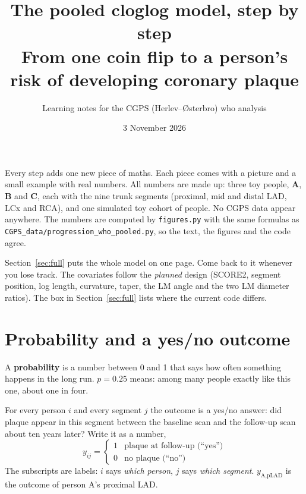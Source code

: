 \documentclass[11pt,a4paper]{article}
\title{The pooled cloglog model, step by step\\[4pt]
\large From one coin flip to a person's risk of developing coronary plaque}
\author{Learning notes for the CGPS (Herlev--Østerbro) who analysis}
\date{3 November 2026}
\begin{document}
\maketitle

\begin{tcolorbox}[colback=black!3,colframe=black!40,title=How to read this]
Every step adds one new piece of maths. Each piece comes with a picture and a small example with real numbers.
All numbers are made up: three toy people, \textbf{A}, \textbf{B} and \textbf{C}, each with the nine trunk segments
(proximal, mid and distal LAD, LCx and RCA), and one simulated toy cohort of \ntoyN{} people.
No CGPS data appear anywhere. The numbers are computed by \texttt{figures.py} with the same formulas as
\texttt{CGPS\_data/progression\_who\_pooled.py}, so the text, the figures and the code agree.

Section~\ref{sec:full} puts the whole model on one page. Come back to it whenever you lose track.
The covariates follow the \emph{planned} design (SCORE2, segment position, log length, curvature, taper, the LM angle and
the two LM diameter ratios). The box in Section~\ref{sec:full} lists where the current code differs.
\end{tcolorbox}

\tableofcontents
\newpage

\section{Probability and a yes/no outcome}
\label{sec:prob}

\begin{idea}
A \textbf{probability} is a number between 0 and 1 that says how often something happens in the long run.
$p = 0.25$ means: among many people exactly like this one, about one in four.
\end{idea}

For every person $i$ and every segment $j$ the outcome is a yes/no answer: did plaque appear in this segment between the
baseline scan and the follow-up scan about ten years later? Write it as a number,
\[
y_{ij} = \begin{cases} 1 & \text{plaque at follow-up (``yes'')} \\ 0 & \text{no plaque (``no'')} \end{cases}
\]
The subscripts are labels: $i$ says \emph{which person}, $j$ says \emph{which segment}. $y_{\text{A},\text{pLAD}}$ is the
outcome of person A's proximal LAD.
\end{document}
